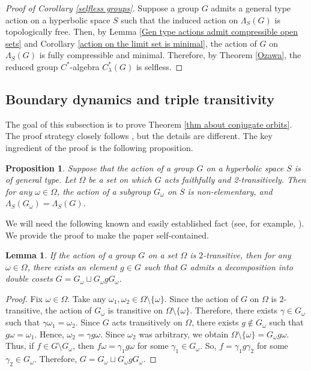 \documentclass[11pt,letterpaper]{article}
\newtheorem{lem}[thm]{Lemma}
\newtheorem{prop}[thm]{Proposition}
\theoremstyle{definition}
\theoremstyle{remark}
\begin{document}
\begin{proof}[Proof of Corollary \ref{selfless groups}]
Suppose a group $G$ admits a general type action on a hyperbolic space $S$ such that the induced action on $\Lambda_S(G)$ is topologically free. Then, by Lemma \ref{Gen type actions admit compressible open sets} and Corollary \ref{action on the limit set is minimal}, the action of $G$ on $\Lambda_S(G)$ is fully compressible and minimal. Therefore, by Theorem \ref{Ozawa}, the reduced group $C^*$-algebra $C_\lambda^*(G)$ is selfless.  
\end{proof}

\subsection{Boundary dynamics and triple transitivity }\label{conjugate orbits}
The goal of this subsection is to prove Theorem \ref{thm about conjugate orbits}. The proof strategy closely follows \cite{BM}, but the details are different. The key ingredient of the proof is the following proposition.


\begin{prop}\label{non-elementary action}
 Suppose that the action of a group $G$ on a hyperbolic space $S$ is of general type. Let $\Omega$ be a set on which $G$ acts faithfully and 2-transitively. Then for any $\omega \in \Omega$, the action of a subgroup $G_\omega$ on $S$ is non-elementary, and $\Lambda_S(G_\omega)=\Lambda_S(G)$.
\end{prop}

 We will need the following known and easily established fact (see, for example, \cite[ex. 47]{La}). We provide the proof to make the paper self-contained. 
     \begin{lem}\label{double cosets}
        If the action of a group $G$ on a set $\Omega$ is $2$-transitive, then for any $\omega \in \Omega$, there exists an element $g \in G$ such that $G$ admits a decomposition into double cosets $G=G_\omega \sqcup G_\omega gG_\omega$.
    \end{lem} 
    \begin{proof}
       Fix $\omega \in \Omega$. Take any $\omega_1, \omega_2 \in \Omega\setminus\{\omega\}$.
       Since the action of $G$ on $\Omega$ is $2$-transitive, the action of $G_\omega$ is transitive on $\Omega \setminus \{\omega\}$. Therefore, there exists $\gamma \in G_\omega$ such that $\gamma \omega_1=\omega_2$. Since $G$ acts transitively on $\Omega$, there exists $g \notin G_\omega$ such that $g\omega = \omega_1$. Hence, $\omega_2=\gamma g\omega$. Since $\omega_2$ was arbitrary, we obtain $\Omega\setminus\{\omega\} = G_\omega g\omega$. Thus, if $f \in G\setminus G_\omega$, then $f\omega=\gamma_1g\omega$ for some $\gamma_1 \in G_\omega$. So, $f=\gamma_1g\gamma_2$ for some $\gamma_2 \in G_\omega$. Therefore, $G= G_\omega \sqcup G_\omega gG_\omega$.
    \end{proof}
\end{document}
